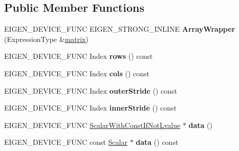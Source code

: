\subsection*{Public Member Functions}
\begin{DoxyCompactItemize}
\item 
\mbox{\label{class_eigen_1_1_array_wrapper_a25496e0fc5930ee2e1f95e90501ef565}} 
E\+I\+G\+E\+N\+\_\+\+D\+E\+V\+I\+C\+E\+\_\+\+F\+U\+NC E\+I\+G\+E\+N\+\_\+\+S\+T\+R\+O\+N\+G\+\_\+\+I\+N\+L\+I\+NE {\bfseries Array\+Wrapper} (Expression\+Type \&\mbox{\hyperlink{class_eigen_1_1_array_base_ac513167ec762bbf639dc375d314d91d3}{matrix}})
\item 
\mbox{\label{class_eigen_1_1_array_wrapper_ad7ed012e7b1358eae13b10277c2c9804}} 
E\+I\+G\+E\+N\+\_\+\+D\+E\+V\+I\+C\+E\+\_\+\+F\+U\+NC Index {\bfseries rows} () const
\item 
\mbox{\label{class_eigen_1_1_array_wrapper_a88bc9963e42bc2a969843ebc703578a9}} 
E\+I\+G\+E\+N\+\_\+\+D\+E\+V\+I\+C\+E\+\_\+\+F\+U\+NC Index {\bfseries cols} () const
\item 
\mbox{\label{class_eigen_1_1_array_wrapper_a609434f57cd4cf65ec7b0ddda6d0fee4}} 
E\+I\+G\+E\+N\+\_\+\+D\+E\+V\+I\+C\+E\+\_\+\+F\+U\+NC Index {\bfseries outer\+Stride} () const
\item 
\mbox{\label{class_eigen_1_1_array_wrapper_adfcf3c2cc3b95a9166fff0ca7ab1d9db}} 
E\+I\+G\+E\+N\+\_\+\+D\+E\+V\+I\+C\+E\+\_\+\+F\+U\+NC Index {\bfseries inner\+Stride} () const
\item 
\mbox{\label{class_eigen_1_1_array_wrapper_af299075d9c9bd0576ce8d79aa6fba248}} 
E\+I\+G\+E\+N\+\_\+\+D\+E\+V\+I\+C\+E\+\_\+\+F\+U\+NC \mbox{\hyperlink{struct_eigen_1_1internal_1_1true__type}{Scalar\+With\+Const\+If\+Not\+Lvalue}} $\ast$ {\bfseries data} ()
\item 
\mbox{\label{class_eigen_1_1_array_wrapper_a253050cfcd86b54212cf7be114120120}} 
E\+I\+G\+E\+N\+\_\+\+D\+E\+V\+I\+C\+E\+\_\+\+F\+U\+NC const \mbox{\hyperlink{class_eigen_1_1_dense_base_a5feed465b3a8e60c47e73ecce83e39a2}{Scalar}} $\ast$ {\bfseries data} () const

\end{DoxyCompactItemize}
